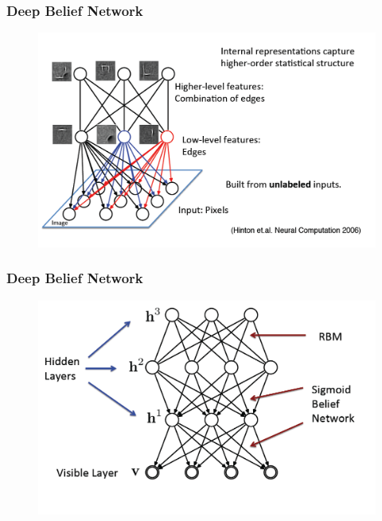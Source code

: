 \documentclass{beamer}
\begin{document}
\begin{frame}
\frametitle{Deep Belief Network}
\begin{figure}
      \includegraphics[width=1\textwidth]{figs/rbm24.png}
\end{figure}
\end{frame}

\begin{frame}
\frametitle{Deep Belief Network}
\begin{figure}
      \includegraphics[width=1\textwidth]{figs/rbm25.png}
\end{figure}
\end{frame}
\end{document}
